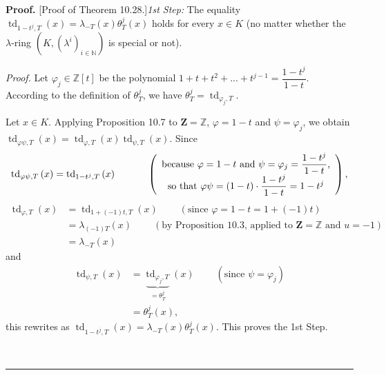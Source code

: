 \documentclass[numbers=enddot,12pt,final,onecolumn,notitlepage]{scrartcl}%
\newenvironment{proof}[1][Proof]{\noindent\textbf{#1.} }{\ \rule{0.5em}{0.5em}}
\begin{document}
\begin{proof}
[Proof of Theorem 10.28.]\textit{1st Step:} The equality $\operatorname*{td}%
\nolimits_{1-t^{j},T}\left(  x\right)  =\lambda_{-T}\left(  x\right)
\theta_{T}^{j}\left(  x\right)  $ holds for every $x\in K$ (no matter whether
the $\lambda$-ring $\left(  K,\left(  \lambda^{i}\right)  _{i\in\mathbb{N}%
}\right)  $ is special or not).

\textit{Proof.} Let $\varphi_{j}\in\mathbb{Z}\left[  t\right]  $ be the
polynomial $1+t+t^{2}+...+t^{j-1}=\dfrac{1-t^{j}}{1-t}$. According to the
definition of $\theta_{T}^{j}$, we have $\theta_{T}^{j}=\operatorname*{td}%
_{\varphi_{j},T}$.

Let $x\in K$. Applying Proposition 10.7 to $\mathbf{Z}=\mathbb{Z}$,
$\varphi=1-t$ and $\psi=\varphi_{j}$, we obtain $\operatorname*{td}%
\nolimits_{\varphi\psi,T}\left(  x\right)  =\operatorname*{td}%
\nolimits_{\varphi,T}\left(  x\right)  \operatorname*{td}\nolimits_{\psi
,T}\left(  x\right)  $. Since%
\[
\operatorname*{td}\nolimits_{\varphi\psi,T}\left(  x\right)
=\operatorname*{td}\nolimits_{1-t^{j},T}\left(  x\right)
\ \ \ \ \ \ \ \ \ \ \left(
\begin{array}
[c]{c}%
\text{because }\varphi=1-t\text{ and }\psi=\varphi_{j}=\dfrac{1-t^{j}}%
{1-t}\text{,}\\
\text{so that }\varphi\psi=\left(  1-t\right)  \cdot\dfrac{1-t^{j}}%
{1-t}=1-t^{j}%
\end{array}
\right)  ,
\]%
\begin{align*}
\operatorname*{td}\nolimits_{\varphi,T}\left(  x\right)   &
=\operatorname*{td}\nolimits_{1+\left(  -1\right)  t,T}\left(  x\right)
\ \ \ \ \ \ \ \ \ \ \left(  \text{since }\varphi=1-t=1+\left(  -1\right)
t\right) \\
&  =\lambda_{\left(  -1\right)  T}\left(  x\right)
\ \ \ \ \ \ \ \ \ \ \left(  \text{by Proposition 10.3, applied to }%
\mathbf{Z}=\mathbb{Z}\text{ and }u=-1\right) \\
&  =\lambda_{-T}\left(  x\right)
\end{align*}
and%
\begin{align*}
\operatorname*{td}\nolimits_{\psi,T}\left(  x\right)   &
=\underbrace{\operatorname*{td}\nolimits_{\varphi_{j},T}}_{=\theta_{T}^{j}%
}\left(  x\right)  \ \ \ \ \ \ \ \ \ \ \left(  \text{since }\psi=\varphi
_{j}\right) \\
&  =\theta_{T}^{j}\left(  x\right)  ,
\end{align*}
this rewrites as $\operatorname*{td}\nolimits_{1-t^{j},T}\left(  x\right)
=\lambda_{-T}\left(  x\right)  \theta_{T}^{j}\left(  x\right)  $. This proves
the 1st Step.


\end{proof}
\end{document}
